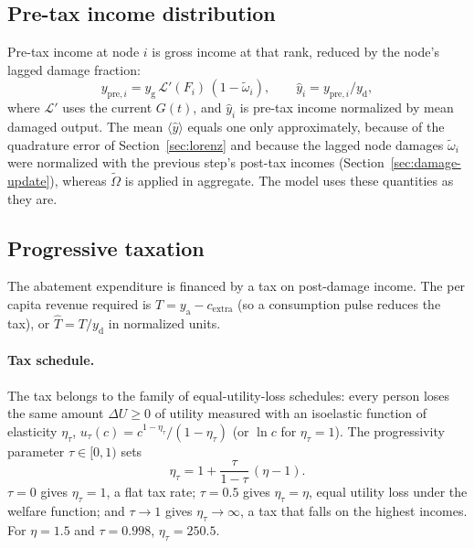 \documentclass[11pt]{article}
\newcommand{\Lor}{\mathcal{L}}
\newcommand{\etat}{\eta_{\tau}}
\newcommand{\yg}{y_{\mathrm{g}}}
\newcommand{\yd}{y_{\mathrm{d}}}
\newcommand{\ya}{y_{\mathrm{a}}}
\begin{document}
\subsection{Pre-tax income distribution}

Pre-tax income at node $i$ is gross income at that rank, reduced by the
node's lagged damage fraction:
\begin{equation}
  y_{\mathrm{pre},i} = \yg\,\Lor'(F_i)\,(1-\tilde\omega_i),
  \qquad \hat y_i = y_{\mathrm{pre},i}/\yd ,
  \label{eq:pretax}
\end{equation}
where $\Lor'$ uses the current $G(t)$, and $\hat y_i$ is pre-tax income
normalized by mean damaged output. The mean $\langle \hat y\rangle$ equals one
only approximately, because of the quadrature error of
Section~\ref{sec:lorenz} and because the lagged node damages $\tilde\omega_i$
were normalized with the previous step's post-tax incomes
(Section~\ref{sec:damage-update}), whereas $\tilde\Omega$ is applied in
aggregate. The model uses these quantities as they are.

\subsection{Progressive taxation}
\label{sec:tax}

The abatement expenditure is financed by a tax on post-damage income. The per
capita revenue required is $T = \ya - c_{\mathrm{extra}}$ (so a consumption
pulse reduces the tax), or $\hat T = T/\yd$ in normalized units.

\paragraph{Tax schedule.} The tax belongs to the family of equal-utility-loss
schedules: every person loses the same amount $\Delta U \ge 0$ of utility
measured with an isoelastic function of elasticity $\etat$,
$u_\tau(c) = c^{1-\etat}/(1-\etat)$ (or $\ln c$ for $\etat = 1$). The
progressivity parameter $\tau\in[0,1)$ sets
\begin{equation}
  \etat = 1 + \frac{\tau}{1-\tau}\,(\eta - 1).
  \label{eq:eta-tau}
\end{equation}
$\tau = 0$ gives $\etat = 1$, a flat tax rate; $\tau = 0.5$ gives
$\etat = \eta$, equal utility loss under the welfare function; and
$\tau\to1$ gives $\etat\to\infty$, a tax that falls on the highest incomes.
For $\eta = 1.5$ and $\tau = 0.998$, $\etat = 250.5$.
\end{document}
